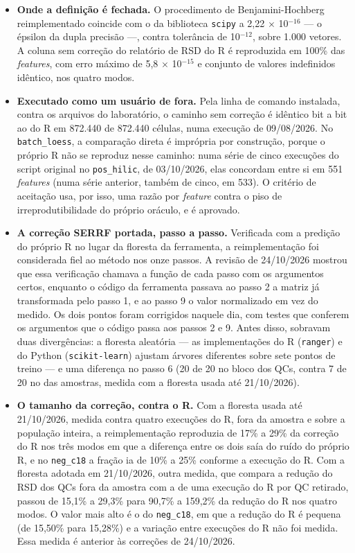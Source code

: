 \begin{itemize}
\item \textbf{Onde a definição é fechada.} O procedimento de Benjamini-Hochberg reimplementado coincide com o da biblioteca \texttt{scipy} a 2,22 $\times$ 10$^{-16}$ --- o épsilon da dupla precisão ---, contra tolerância de 10$^{-12}$, sobre 1.000 vetores. A coluna sem correção do relatório de RSD do R é reproduzida em 100\% das \textit{features}, com erro máximo de 5,8 $\times$ 10$^{-15}$ e conjunto de valores indefinidos idêntico, nos quatro modos.
\item \textbf{Executado como um usuário de fora.} Pela linha de comando instalada, contra os arquivos do laboratório, o caminho sem correção é idêntico bit a bit ao do R em 872.440 de 872.440 células, numa execução de 09/08/2026. No \texttt{batch\_\allowbreak{}loess}, a comparação direta é imprópria por construção, porque o próprio R não se reproduz nesse caminho: numa série de cinco execuções do script original no \texttt{pos\_\allowbreak{}hilic}, de 03/10/2026, elas concordam entre si em 551 \textit{features} (numa série anterior, também de cinco, em 533). O critério de aceitação usa, por isso, uma razão por \textit{feature} contra o piso de irreprodutibilidade do próprio oráculo, e é aprovado.
\item \textbf{A correção SERRF portada, passo a passo.} Verificada com a predição do próprio R no lugar da floresta da ferramenta, a reimplementação foi considerada fiel ao método nos onze passos. A revisão de 24/10/2026 mostrou que essa verificação chamava a função de cada passo com os argumentos certos, enquanto o código da ferramenta passava ao passo 2 a matriz já transformada pelo passo 1, e ao passo 9 o valor normalizado em vez do medido. Os dois pontos foram corrigidos naquele dia, com testes que conferem os argumentos que o código passa aos passos 2 e 9. Antes disso, sobravam duas divergências: a floresta aleatória --- as implementações do R (\texttt{ranger}) e do Python (\texttt{scikit-\allowbreak{}learn}) ajustam árvores diferentes sobre sete pontos de treino --- e uma diferença no passo 6 (20 de 20 no bloco dos QCs, contra 7 de 20 no das amostras, medida com a floresta usada até 21/10/2026).
\item \textbf{O tamanho da correção, contra o R.} Com a floresta usada até 21/10/2026, medida contra quatro execuções do R, fora da amostra e sobre a população inteira, a reimplementação reproduzia de 17\% a 29\% da correção do R nos três modos em que a diferença entre os dois saía do ruído do próprio R, e no \texttt{neg\_\allowbreak{}c18} a fração ia de 10\% a 25\% conforme a execução do R. Com a floresta adotada em 21/10/2026, outra medida, que compara a redução do RSD dos QCs fora da amostra com a de uma execução do R por QC retirado, passou de 15,1\% a 29,3\% para 90,7\% a 159,2\% da redução do R nos quatro modos. O valor mais alto é o do \texttt{neg\_\allowbreak{}c18}, em que a redução do R é pequena (de 15,50\% para 15,28\%) e a variação entre execuções do R não foi medida. Essa medida é anterior às correções de 24/10/2026.

\end{itemize}
